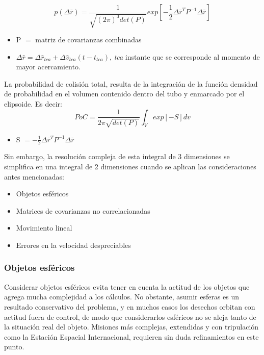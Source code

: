 \begin{equation}
 p(\Delta \bar{r})=\frac{1}{\sqrt{(2 \pi)^{3} det(P)}} exp [-\frac{1}{2}\Delta \bar{r}^{T}P^{-1}\Delta \bar{r}]
 \label{eq:densidadProbabilidad}
\end{equation}

\begin{itemize}
 \item P $=$ matriz de covarianzas combinadas
 \item $\Delta \bar{r} = \Delta \bar{r}_{tca} + \Delta \bar{v}_{tca}(t-t_{tca})$, {\it{tca}} instante que se corresponde al momento de mayor acercamiento. 
\end{itemize}

La probabilidad de colisi\'on total, resulta de la integraci\'on de la funci\'on densidad de probabilidad en el volumen contenido dentro del tubo y enmarcado por el elipsoide. Es decir:\\ 

\begin{equation}
 PoC=\frac{1}{2 \pi \sqrt{det(P)}} \int_{V} exp [-S] dv
 \label{eq:pocintegralVolumen}
\end{equation}

\begin{itemize}
 \item S $= -\frac{1}{2}\Delta \bar{r}^{T}P^{-1}\Delta \bar{r}$
\end{itemize}

Sin embargo, la resoluci\'on compleja de esta integral de 3 dimensiones se simplifica en una integral de 2 dimensiones cuando se aplican las consideraciones antes mencionadas: 

\begin{itemize}
 \item Objetos esf\'ericos
 \item Matrices de covarianzas no correlacionadas
 \item Movimiento lineal
 \item Errores en la velocidad despreciables
\end{itemize} 

\subsubsection*{Objetos esf\'ericos}
Considerar objetos esf\'ericos evita tener en cuenta la actitud de los objetos que agrega mucha complejidad a los c\'alculos. No obstante, asumir esferas es un resultado conservativo del problema, y en muchos casos los desechos orbitan con actitud fuera de control, de modo que considerarlos esf\'ericos no se aleja tanto de la situaci\'on real del objeto. Misiones m\'as complejas, extendidas y con tripulaci\'on como la Estaci\'on Espacial Internacional, requieren sin duda refinamientos en este punto. 


